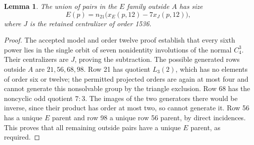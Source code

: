 \documentclass[11pt,a4paper]{article}
\newtheorem{lemma}{Lemma}\newtheorem{theorem}{Theorem}
\begin{document}
\begin{lemma}\label{E}
The union of pairs in the $E$ family outside $A$ has size
\[
             E(p)=n_{21}\bigl(x_E(p,12)-7x_J(p,12)\bigr),     \tag{11}
\]
where $J$ is the retained centralizer of order 1536.
\end{lemma}
\begin{proof}
The accepted model and order twelve proof establish that every sixth
power lies in the single orbit of seven nonidentity involutions of
the normal $C_4^3$. Their centralizers are $J$, proving the subtraction.
The possible generated rows outside $A$ are $21,56,68,98$.
Row 21 has quotient $L_3(2)$, which has no elements of order six or
twelve; the permitted projected orders are again at most four and
cannot generate this nonsolvable group by the triangle exclusion.
Row 68 has the noncyclic odd quotient $7:3$. The images of the two
generators there would be inverse, since their product has order at
most two, so cannot generate it. Row 56 has a unique $E$ parent and
row 98 a unique row 56 parent, by direct incidences. This proves that
all remaining outside pairs have a unique $E$ parent, as required.
\end{proof}
\end{document}
